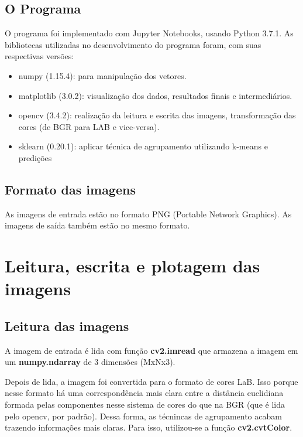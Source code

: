 \documentclass{article}
\begin{document}
\subsection{O Programa}

O programa foi implementado com Jupyter Notebooks, usando Python 3.7.1. As bibliotecas utilizadas no desenvolvimento do programa foram, com suas respectivas versões: 

\begin{itemize}
    \item numpy (1.15.4): para manipulação dos vetores.

    \item matplotlib (3.0.2): visualização dos dados, resultados finais e intermediários.

    \item opencv (3.4.2): realização da leitura e escrita das imagens, transformação das cores (de BGR para LAB e vice-versa).
    
    \item sklearn (0.20.1): aplicar técnica de agrupamento utilizando k-means e predições

\end{itemize}

\subsection{Formato das imagens}

As imagens de entrada estão no formato PNG (Portable Network Graphics). As imagens de saída também estão no mesmo formato.

\section{Leitura, escrita e plotagem das imagens}

\subsection{Leitura das imagens}

A imagem de entrada é lida com função \textbf{cv2.imread} que armazena a imagem em um \textbf{numpy.ndarray} de 3 dimensões (MxNx3).

Depois de lida, a imagem foi convertida para o formato de cores LaB. Isso porque nesse formato há uma correspondência mais clara entre a distância euclidiana formada pelas componentes nesse sistema de cores do que na BGR (que é lida pelo opencv, por padrão). Dessa forma, as técnincas de agrupamento acabam trazendo informações mais claras. Para isso, utilizou-se a função \textbf{cv2.cvtColor}.
\end{document}
